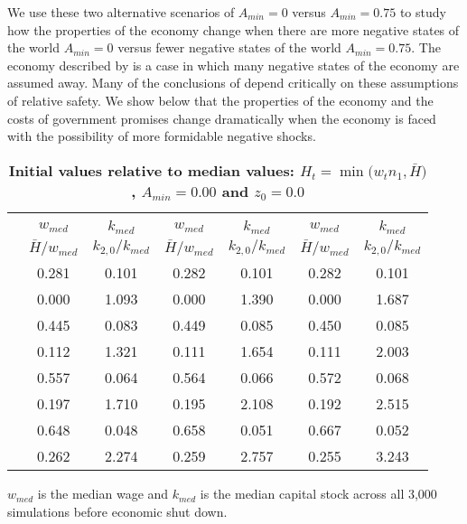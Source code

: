 \documentclass[letterpaper,12pt]{article}
\theoremstyle{definition}
\begin{document}
\begin{spacing}{1.5}
  We use these two alternative scenarios of $A_{min}=0$ versus $A_{min}=0.75$ to study how the properties of the economy change when there are more negative states of the world $A_{min}=0$ versus fewer negative states of the world $A_{min}=0.75$. The economy described by \citet{Blanchard:2019} is a case in which many negative states of the economy are assumed away. Many of the conclusions of \citet{Blanchard:2019} depend critically on these assumptions of relative safety. We show below that the properties of the economy and the costs of government promises change dramatically when the economy is faced with the possibility of more formidable negative shocks.


  \begin{table}[htbp]\centering\captionsetup{width=5.3in}
  \caption{\label{TabInitVal_A0}\textbf{Initial values relative to median values: $H_t = \min\bigl(w_t n_1, \bar{H}\bigr)$, $A_{min}=0.00$ and $z_0=0.0$}}
    \begin{threeparttable}
    \begin{tabular}{>{\small}c| >{\small}c >{\small}c| >{\small}c >{\small}c| >{\small}c >{\small}c}
      \hline\hline
      & \multicolumn{2}{c}{$k_{2,0}=0.11$} & \multicolumn{2}{c}{$k_{2,0}=0.14$} & \multicolumn{2}{c}{$k_{2,0}=0.17$} \\ \cline{2-7}
      & $w_{med}$ & $k_{med}$ & $w_{med}$ & $k_{med}$ & $w_{med}$ & $k_{med}$ \\
      & $\bar{H}/w_{med}$ & $k_{2,0}/k_{med}$ & $\bar{H}/w_{med}$ & $k_{2,0}/k_{med}$ & $\bar{H}/w_{med}$ & $k_{2,0}/k_{med}$ \\
      \hline
      \multirow{2}{*}{$\bar{H}=0.00$}
      & 0.281 & 0.101 & 0.282 & 0.101 & 0.282 & 0.101 \\
      & 0.000 & 1.093 & 0.000 & 1.390 & 0.000 & 1.687 \\
      \hline
      \multirow{2}{*}{$\bar{H}=0.05$}
      & 0.445 & 0.083 & 0.449 & 0.085 & 0.450 & 0.085 \\
      & 0.112 & 1.321 & 0.111 & 1.654 & 0.111 & 2.003 \\
      \hline
      \multirow{2}{*}{$\bar{H}=0.11$}
      & 0.557 & 0.064 & 0.564 & 0.066 & 0.572 & 0.068 \\
      & 0.197 & 1.710 & 0.195 & 2.108 & 0.192 & 2.515 \\
      \hline
      \multirow{2}{*}{$\bar{H}=0.17$}
      & 0.648 & 0.048 & 0.658 & 0.051 & 0.667 & 0.052 \\
      & 0.262 & 2.274 & 0.259 & 2.757 & 0.255 & 3.243 \\
      \hline\hline
    \end{tabular}
    \begin{tablenotes}
      \scriptsize{\item[]$w_{med}$ is the median wage and $k_{med}$ is the median capital stock across all 3,000 simulations before economic shut down.}
    \end{tablenotes}
    \end{threeparttable}
  \end{table}


\end{spacing}
\end{document}
